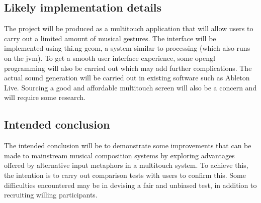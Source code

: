 \documentclass[a4paper,twoside,twocolumn]{article}
\begin{document}
\subsection{Likely implementation details}
\label{sec:org27a33ef}
The project will be produced as a multitouch application that will allow users to carry out a limited amount of musical gestures. The interface will be implemented using thi.ng geom, a system similar to processing (which also runs on the jvm). To get a smooth user interface experience, some opengl programming will also be carried out which may add further complications. The actual sound generation will be carried out in existing software such as Ableton Live. Sourcing a good and affordable multitouch screen will also be a concern and will require some research. 

\subsection{Intended conclusion}
\label{sec:org5eba97f}
The intended conclusion will be to demonstrate some improvements that can be made to mainstream musical composition systems by exploring advantages offered by alternative input metaphors in a multitouch system. To achieve this, the intention is to carry out comparison tests with users to confirm this. Some difficulties encountered may be in devising a fair and unbiased test, in addition to recruiting willing participants.



\end{document}
